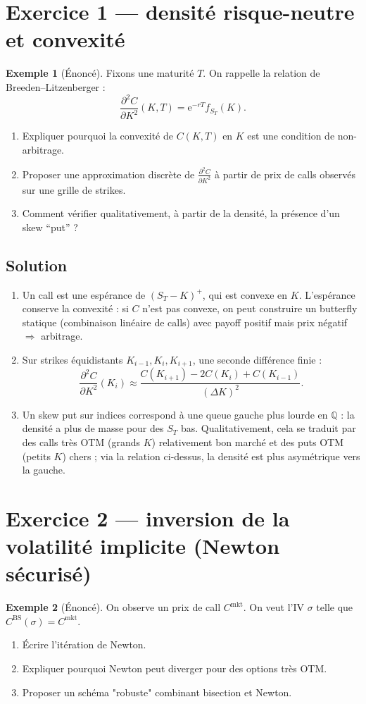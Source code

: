 \documentclass[11pt,a4paper]{report}
\newcommand{\ee}{\mathrm{e}}
\newcommand{\Q}{\mathbb{Q}}
\newcommand{\1}{\mathbbm{1}}
\newcommand{\pdd}[2]{\frac{\partial^2 #1}{\partial #2^2}}
\theoremstyle{definition}
\newtheorem{example}{Exemple}[chapter]
\theoremstyle{plain}
\theoremstyle{remark}
\begin{document}
\section{Exercice 1 --- densité risque-neutre et convexité}
\begin{example}[Énoncé]
Fixons une maturité $T$.
On rappelle la relation de Breeden--Litzenberger :
\[\pdd{C}{K}(K,T)=\ee^{-rT} f_{S_T}(K).
\]
\begin{enumerate}[label=\alph*)]
  \item Expliquer pourquoi la convexité de $C(K,T)$ en $K$ est une condition de non-arbitrage.
  \item Proposer une approximation discrète de $\pdd{C}{K}$ à partir de prix de calls observés sur une grille de strikes.
  \item Comment vérifier qualitativement, à partir de la densité, la présence d'un skew ``put'' ?
\end{enumerate}
\end{example}

\subsection*{Solution}
\begin{enumerate}[label=\alph*)]
  \item Un call est une espérance de $(S_T-K)^+$, qui est convexe en $K$.
  L'espérance conserve la convexité : si $C$ n'est pas convexe, on peut construire un butterfly statique (combinaison linéaire de calls) avec payoff positif mais prix négatif $\Rightarrow$ arbitrage.
  \item Sur strikes équidistants $K_{i-1},K_i,K_{i+1}$, une seconde différence finie :
  \[\pdd{C}{K}(K_i) \approx \frac{C(K_{i+1})-2C(K_i)+C(K_{i-1})}{(\Delta K)^2}.
  \]
  \item Un skew put sur indices correspond à une queue gauche plus lourde en $\Q$ : la densité a plus de masse pour des $S_T$ bas.
  Qualitativement, cela se traduit par des calls très OTM (grands $K$) relativement bon marché et des puts OTM (petits $K$) chers ; via la relation ci-dessus, la densité est plus asymétrique vers la gauche.
\end{enumerate}

\section{Exercice 2 --- inversion de la volatilité implicite (Newton sécurisé)}
\begin{example}[Énoncé]
On observe un prix de call $C^{\mathrm{mkt}}$.
On veut l'IV $\sigma$ telle que $C^{\mathrm{BS}}(\sigma)=C^{\mathrm{mkt}}$.
\begin{enumerate}[label=\alph*)]
  \item Écrire l'itération de Newton.
  \item Expliquer pourquoi Newton peut diverger pour des options très OTM.
  \item Proposer un schéma "robuste" combinant bisection et Newton.
\end{enumerate}
\end{example}
\end{document}

